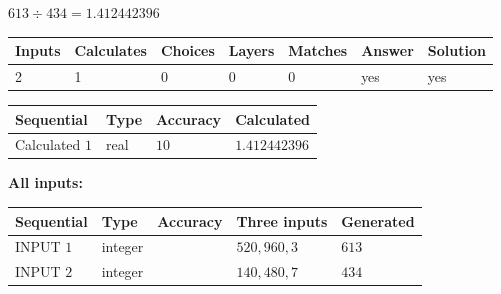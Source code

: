 \documentclass{ctexart}
\begin{document}
 

$ %
613 \div  %
434=   %
1.412442396$
 
 
\noindent{}
 
 

 
   
   
   
   
\noindent\begin{tabular}{|l|l|l|l|l|l|l|}
 \hline
Inputs & Calculates & Choices & Layers & Matches & Answer & Solution \\ \hline
 2  & 
 1  & 
 0
  & 
 0  & 
 0  & 
  yes & 
  yes 
  \\ \hline
 \end{tabular}
   
   
   
   
\noindent{}
   
   
  
  
\noindent\begin{tabular}{|l|l|l|l|}
\hline
 Sequential & Type & Accuracy & Calculated \\ 
\hline
 
 
  Calculated $  1 $ & real & $  10  $ & 
 $ 1.412442396 $ 
 \\  \hline  
 \end{tabular}
   
   
   
   
\noindent\vspace{0.1in}\hspace{-0.08in} {\textbf{\Large{All inputs: }}}
   
   
  
  
\noindent\begin{tabular}{|l|l|l|l|l|}
\hline
 Sequential & Type & Accuracy & Three inputs & Generated \\ 
\hline
 
 
  INPUT $  1 $ & integer &  & $
 520
 , 
 960
 , 
 3
 $ & $ 613 $ 
 \\  \hline  
 
 
  INPUT $  2 $ & integer &  & $
 140
 , 
 480
 , 
 7
 $ & $ 434 $ 
 \\  \hline  
 \end{tabular}
   
   
  
\vspace{0.2in}
  
\end{document}

